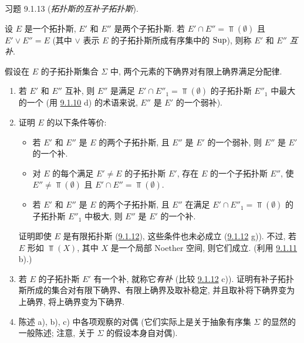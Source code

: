 \begin{enonce*}[remark]{习题 9.1.13}
(\emph{拓扑斯的互补子拓扑斯}).

设 $E$ 是一个拓扑斯, $E'$ 和 $E''$ 是两个子拓扑斯.
若 $E'\cap E''=\Top(∅)$ 且 $E'\vee E''=E$
(其中 $\vee$ 表示 $E$ 的子拓扑斯所成有序集中的 $\operatorname{Sup}$),
则称 $E'$ 和 $E''$ \emph{互补}.

假设在 $E$ 的子拓扑斯集合 $\Sigma$ 中,
两个元素的下确界对有限上确界满足分配律.

\begin{enumerate}
\renewcommand{\theenumi}{\alph{enumi}}
\renewcommand{\labelenumi}{\theenumi)}
\item 若 $E'$ 和 $E''$ 互补,
则 $E''$ 是满足 $E'\cap E''_1=\Top(∅)$ 的子拓扑斯 $E''_1$ 中最大的一个
(\ie 用 \hyperref[IV.exer9.1.10]{9.1.10} d) 的术语来说,
$E''$ 是 $E'$ 的一个弱补).

\item 证明 $E$ 的以下条件等价:
\begin{itemize}
\item[(i)] 若 $E'$ 和 $E''$ 是 $E$ 的两个子拓扑斯,
且 $E''$ 是 $E'$ 的一个弱补,
则 $E''$ 是 $E'$ 的一个补.

\item[(ii)] 对 $E$ 的每个满足 $E'\neq E$ 的子拓扑斯 $E'$,
存在 $E$ 的一个子拓扑斯 $E''$,
使 $E''\neq\Top(∅)$ 且 $E'\cap E''=\Top(∅)$.

\item[(i bis)] 若 $E'$ 和 $E''$ 是 $E$ 的两个子拓扑斯,
且 $E''$ 在满足 $E'\cap E''_1=\Top(∅)$ 的子拓扑斯 $E''_1$ 中极大,
则 $E''$ 是 $E'$ 的一个补.
\end{itemize}

证明即使 $E$ 是有限拓扑斯 (\hyperref[IV.exer9.1.12]{9.1.12}),
这些\pageoriginale 条件也未必成立
(\hyperref[IV.exer9.1.12]{9.1.12} g)).
不过, 若 $E$ 形如 $\Top(X)$,
其中 $X$ 是一个局部 Noether 空间, 则它们成立.
(利用 \hyperref[IV.exer9.1.11]{9.1.11} b).)

\item 若 $E$ 的子拓扑斯 $E'$ 有一个补,
就称它\emph{有补} (比较 \hyperref[IV.exer9.1.12]{9.1.12} c)).
证明有补子拓扑斯所成的集合对有限下确界、有限上确界及取补稳定,
并且取补将下确界变为上确界, 将上确界变为下确界.

\item 陈述 a), b), c) 中各项观察的对偶
(它们实际上是关于抽象有序集 $\Sigma$ 的显然的一般陈述;
注意, 关于 $\Sigma$ 的假设本身自对偶).
\end{enumerate}
\end{enonce*}


